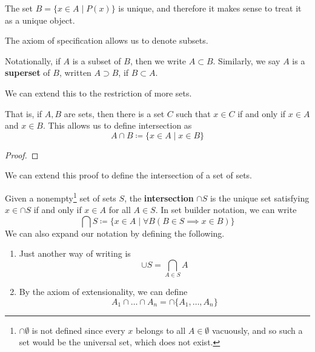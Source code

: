   \begin{lemma}
    The set $B = \{x \in A \mid P(x) \}$ is unique, and therefore it makes sense to treat it as a unique object. 
  \end{lemma}

  The axiom of specification allows us to denote subsets. 

  \begin{definition}
    Notationally, if $A$ is a subset of $B$, then we write $A \subset B$. Similarly, we say $A$ is a \textbf{superset} of $B$, written $A \supset B$, if $B \subset A$. 
  \end{definition} 

  We can extend this to the restriction of more sets. 

  \begin{theorem}
    That is, if $A, B$ are sets, then there is a set $C$ such that $x \in C$ if and only if $x \in A$ and $x \in B$. This allows us to define intersection as 
    \begin{equation}
      A \cap B \coloneqq \{x \in A \mid x \in B \}
    \end{equation} 
  \end{theorem} 
  \begin{proof}
    
  \end{proof} 

  We can extend this proof to define the intersection of a set of sets. 
  
  \begin{definition}[Intersection]
    Given a nonempty\footnote{$\cap \emptyset$ is not defined since every $x$ belongs to all $A \in \emptyset$ vacuously, and so such a set would be the universal set, which does not exist.} set of sets $S$, the \textbf{intersection} $\cap S$ is the unique set satisfying $x \in \cap S$ if and only if $x \in A$ for all $A \in S$. In set builder notation, we can write 
    \begin{equation}
      \bigcap S \coloneqq \{x \in A \mid \forall B (B \in S \implies x \in B) \}
    \end{equation}
    We can also expand our notation by defining the following. 
    \begin{enumerate}
      \item Just another way of writing is 
        \begin{equation}
          \cup S = \bigcap_{A \in S} A
        \end{equation}

      \item By the axiom of extensionality, we can define 
        \begin{equation}
          A_1 \cap \ldots \cap A_n = \cap \{A_1, \ldots, A_n\}
        \end{equation}
    \end{enumerate}
  \end{definition}

